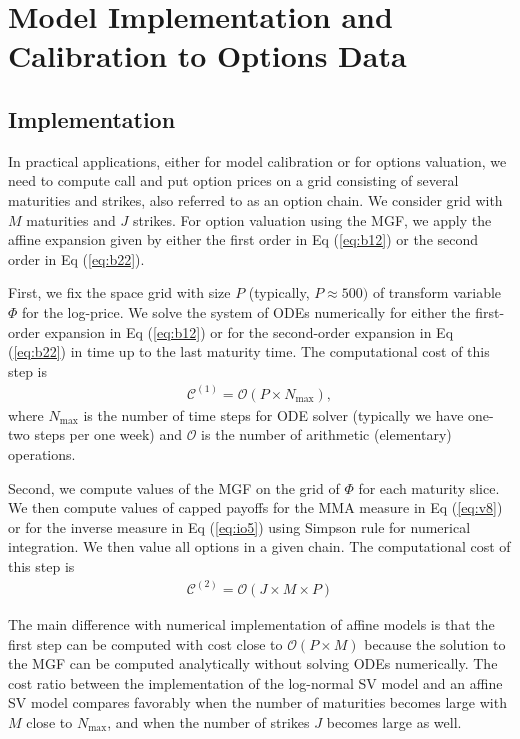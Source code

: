 \documentclass[pdftex,11pt,a4paper] {article}
\begin{document}
\section{Model Implementation and Calibration to Options Data}\label{sec:empirics}

\subsection{Implementation}

In practical applications, either for model calibration or for options valuation, we need to compute call and put option prices on a grid consisting of several maturities and strikes, also referred to as an option chain. We consider grid with $M$ maturities and $J$ strikes. For option valuation using the MGF, we apply the affine expansion given by either the first order in Eq (\ref{eq:b12}) or the second order in Eq (\ref{eq:b22}).

First, we fix the space grid with size $P$ (typically, $P\approx 500)$ of transform variable $\Phi$ for the log-price. We solve the system of ODEs numerically for either the first-order expansion in Eq (\ref{eq:b12}) or for the second-order expansion in Eq (\ref{eq:b22}) in time up to the last maturity time. The computational cost of this step is
\begin{equation}\label {eq:comp2}
\begin{split}
\mathcal{C}^{(1)} = \mathcal{O} \left( P \times N_{\max} \right),
\end{split}
\end{equation}
where $N_{\max}$ is the number of time steps for ODE solver (typically we have one-two steps per one week) and $\mathcal{O}$ is the number of arithmetic (elementary) operations.


Second, we compute values of the MGF on the grid of $\Phi$ for each maturity slice. We then compute values of capped payoffs for the MMA measure in Eq (\ref{eq:v8}) or for the inverse measure in Eq (\ref{eq:io5}) using Simpson rule for numerical integration. We then value all options in a given chain. The computational cost of this step is
\begin{equation}\label {eq:comp3}
\begin{split}
\mathcal{C}^{(2)} = \mathcal{O}  \left( J \times M \times P \right)
\end{split}
\end{equation}


The main difference with numerical implementation of affine models is that the first step can be computed with cost close to $\mathcal{O} \left( P \times M\right)$ because the solution to the MGF can be computed analytically without solving ODEs numerically. The cost ratio between the implementation of the log-normal SV model and an affine SV model compares favorably when the number of maturities becomes large with $M$ close to $N_{\max}$, and when the number of strikes $J$ becomes large as well.
\end{document}

